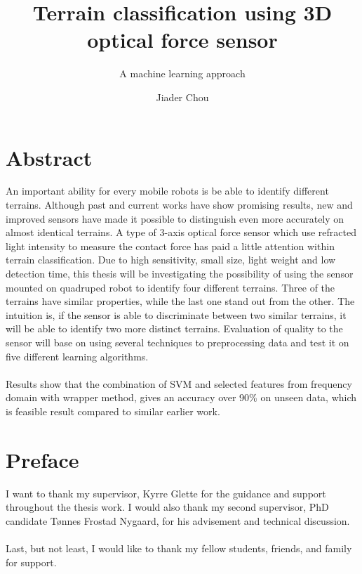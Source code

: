 \documentclass[USenglish]{ifimaster}  %
\title{Terrain classification using 3D optical force sensor}        %
\subtitle{A machine learning approach}
\author{Jiader Chou}                      %
\begin{document}
	\ififorside{}
	\frontmatter{}
	\maketitle{}
	
	\frontmatter{}
\chapter*{Abstract}                   %
An important ability for every mobile robots is be able to identify different terrains. Although past and current works have show promising results, new and improved sensors have made it possible to distinguish even more accurately on almost identical terrains. A type of 3-axis optical force sensor which use refracted light intensity to measure the contact force has paid a little attention within terrain classification. Due to high sensitivity, small size, 	light weight and low detection time, this thesis will be investigating the possibility of using the sensor mounted on quadruped robot to identify four different terrains. Three of the terrains have similar properties, while the last one stand out from the other. The intuition is, if the sensor is able to discriminate between two similar terrains, it will be able to identify two more distinct terrains. Evaluation of quality to the sensor will base on using several techniques to preprocessing data and test it on five different learning algorithms.
\\
\\
Results show that the combination of SVM and selected features from frequency domain with wrapper method, gives an accuracy over 90\% on unseen data, which is feasible result compared to similar earlier work.
	

	
\tableofcontents{}
\listoffigures{}
\listoftables{}
	
\chapter*{Preface}                    %
I want to thank my supervisor, Kyrre Glette for the guidance and support throughout the thesis work. I would also thank my second supervisor, PhD candidate Tønnes Frostad Nygaard, for his advisement and technical discussion.
\\
\\
Last, but not least, I would like to thank my fellow students, friends, and family for support.
	
\end{document}
